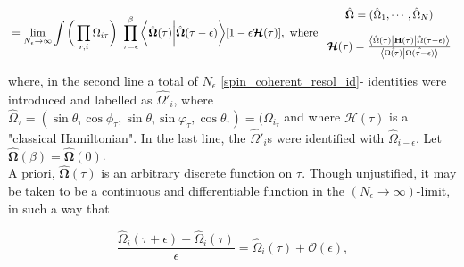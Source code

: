\begin{equation}
\begin{split}
    &= \lim_{N_{\epsilon} \rightarrow \infty} \int \bigg( \prod_{r, i} {{\Omega}}_{i \tau} \bigg) \textnormal{ } \prod_{\tau = \epsilon}^{\beta} \bigg\langle \hat{\bm{\Omega}}(\tau) \bigg| \hat{\bm{\Omega}}(\tau - \epsilon) \bigg\rangle [1 - \epsilon \bm{\mathcal{H}}(\tau)], \textnormal{ where } \begin{array}{cc}
         \hat{\bm{\Omega}} = (\hat{{\Omega}}_1, \cdots, \hat{{\Omega}}_N)  \\
         \\
         \bm{\mathcal{H}}(\tau) = \frac{\bra{\hat{\Omega}(\tau)} {{\bf H}}(\tau) \ket{\hat{\Omega}(\tau - \epsilon)}}{\bra{\hat{\Omega(\tau)}} \ket{\hat{\Omega(\tau - \epsilon)}}}
    \end{array} \\
    \label{generating_function_and_cl_hammiltonian}
\end{split}
\end{equation}

where, in the second line a total of $N_{\epsilon}$ \cref{spin_coherent_resol_id}-
identities were introduced and labelled as 
$\hat{\Omega'}_i$, where $\hat{\Omega}_\tau 
= (\sin \theta_\tau \cos \phi_\tau, \sin 
\theta_\tau \sin \varphi_\tau, \cos 
\theta_\tau) = (\Omega_i_\tau$ and where 
$\bm{\mathcal{H}}(\tau)$ is a "classical 
Hamiltonian". In the last line, the 
$\hat{\Omega'}_{i}$s were identified with 
$\hat{\Omega}_{i-\epsilon}$. Let 
$\hat{\bm{\Omega}}(\beta) = 
\hat{\bm{\Omega}}(0)$. \\

A priori, $\hat{\bm{\Omega}}(\tau)$ is an arbitrary discrete function on $\tau$. Though unjustified, it may be taken to be a continuous and differentiable function in the $(N_{\epsilon}\rightarrow\infty)$-limit, in such a way that 

\begin{equation}
    \frac{\hat{{\Omega}}_i(\tau + \epsilon) - \hat{{\Omega}}_i(\tau)}{\epsilon} = \hat{{\Omega}}_i(\tau) + \mathcal{O}(\epsilon),
\end{equation}

